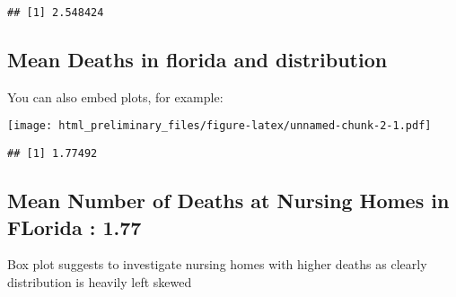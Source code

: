 \documentclass[
]{article}
\newenvironment{Shaded}{\begin{snugshade}}{\end{snugshade}}
\newcommand{\DataTypeTok}[1]{\textcolor[rgb]{0.13,0.29,0.53}{#1}}
\newcommand{\KeywordTok}[1]{\textcolor[rgb]{0.13,0.29,0.53}{\textbf{#1}}}
\newcommand{\NormalTok}[1]{#1}
\newcommand{\OperatorTok}[1]{\textcolor[rgb]{0.81,0.36,0.00}{\textbf{#1}}}
\newcommand{\StringTok}[1]{\textcolor[rgb]{0.31,0.60,0.02}{#1}}
\begin{document}
\begin{verbatim}
## [1] 2.548424
\end{verbatim}

\hypertarget{mean-deaths-in-florida-and-distribution}{%
\subsection{Mean Deaths in florida and
distribution}\label{mean-deaths-in-florida-and-distribution}}

You can also embed plots, for example:

\begin{Shaded}
\end{Shaded}

\texttt{[image: html\_preliminary\_files/figure-latex/unnamed-chunk-2-1.pdf]}

\begin{Shaded}
\end{Shaded}

\begin{verbatim}
## [1] 1.77492
\end{verbatim}

\hypertarget{mean-number-of-deaths-at-nursing-homes-in-florida-1.77}{%
\subsection{Mean Number of Deaths at Nursing Homes in FLorida :
1.77}\label{mean-number-of-deaths-at-nursing-homes-in-florida-1.77}}

Box plot suggests to investigate nursing homes with higher deaths as
clearly distribution is heavily left skewed
\end{document}
